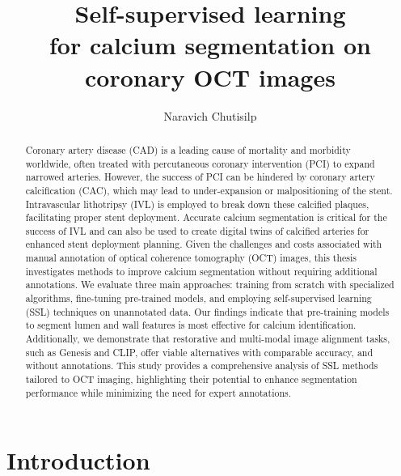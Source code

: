 \documentclass[a4paper,11pt,oneside]{report}
\title{Self-supervised learning\\for calcium segmentation on coronary OCT images}
\author{Naravich Chutisilp}
\begin{document}
\maketitle
\makededication
\makeacks

\begin{abstract}


Coronary artery disease (CAD) is a leading cause of mortality and morbidity worldwide, often treated with percutaneous coronary intervention (PCI) to expand narrowed arteries. However, the success of PCI can be hindered by coronary artery calcification (CAC), which may lead to under-expansion or malpositioning of the stent. Intravascular lithotripsy (IVL) is employed to break down these calcified plaques, facilitating proper stent deployment. Accurate calcium segmentation is critical for the success of IVL and can also be used to create digital twins of calcified arteries for enhanced stent deployment planning. Given the challenges and costs associated with manual annotation of optical coherence tomography (OCT) images, this thesis investigates methods to improve calcium segmentation without requiring additional annotations. We evaluate three main approaches: training from scratch with specialized algorithms, fine-tuning pre-trained models, and employing self-supervised learning (SSL) techniques on unannotated data. Our findings indicate that pre-training models to segment lumen and wall features is most effective for calcium identification. Additionally, we demonstrate that restorative and multi-modal image alignment tasks, such as Genesis and CLIP, offer viable alternatives with comparable accuracy, and without annotations. This study provides a comprehensive analysis of SSL methods tailored to OCT imaging, highlighting their potential to enhance segmentation performance while minimizing the need for expert annotations.
\end{abstract}

\maketoc

\chapter{Introduction}
\end{document}
